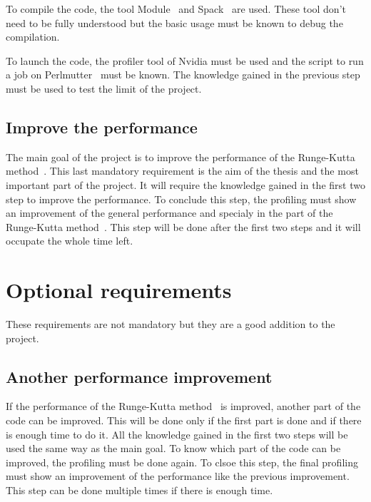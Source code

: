 To compile the code, the tool Module~\cite{Module} and Spack~\cite{Spack} are used.
These tool don't need to be fully understood but the basic usage must be known to debug the compilation.

To launch the code, the profiler tool of Nvidia must be used and the script to run a job on Perlmutter~\cite{Perlmutter} must be known.
The knowledge gained in the previous step must be used to test the limit of the project.


\subsection{Improve the performance}
\label{spec:ch:goals:mandatory-requirements:improve-the-performance}

The main goal of the project is to improve the performance of the Runge-Kutta method~\cite{Runge-Kutta-methods}.
This last mandatory requirement is the aim of the thesis and the most important part of the project.
It will require the knowledge gained in the first two step to improve the performance.
To conclude this step, the profiling must show an improvement of the general performance and specialy in the part of the Runge-Kutta method~\cite{Runge-Kutta-methods}.
This step will be done after the first two steps and it will occupate the whole time left.


\section{Optional requirements}
\label{spec:ch:goals:optional-requirements}

These requirements are not mandatory but they are a good addition to the project.

\subsection{Another performance improvement}
\label{spec:ch:goals:optional-requirements:another-performance-improvement}

If the performance of the Runge-Kutta method~\cite{Runge-Kutta-methods} is improved, another part of the code can be improved.
This will be done only if the first part is done and if there is enough time to do it.
All the knowledge gained in the first two steps will be used the same way as the main goal.
To know which part of the code can be improved, the profiling must be done again.
To clsoe this step, the final profiling must show an improvement of the performance like the previous improvement.
This step can be done multiple times if there is enough time.

